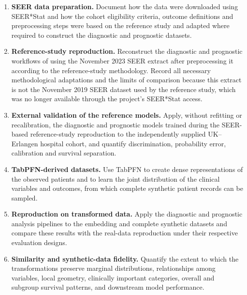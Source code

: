 \begin{enumerate}[label=\textbf{O\arabic*.},ref=O\arabic*]
\item \label{obj:data}\textbf{SEER data preparation.}
Document how the data were downloaded using SEER*Stat and how the cohort
eligibility criteria, outcome definitions and preprocessing steps were based on
the reference study and adapted where required to construct the diagnostic and
prognostic datasets.

\item \label{obj:reference}\textbf{Reference-study reproduction.}
Reconstruct the diagnostic and prognostic workflows of \citet{Li2023} using the
November 2023 SEER extract after preprocessing it according to the
reference-study methodology. Record all necessary methodological adaptations and
the limits of comparison because this extract is not the November 2019 SEER
dataset used by the reference study, which was no longer available through the
project's SEER*Stat access.

\item \label{obj:external}\textbf{External validation of the reference models.}
Apply, without refitting or recalibration, the diagnostic and prognostic models
trained during the SEER-based reference-study reproduction to the independently
supplied UK--Erlangen hospital cohort, and quantify discrimination, probability
error, calibration and survival separation.

\item \label{obj:transformations}\textbf{TabPFN-derived datasets.}
Use TabPFN to create dense representations of the observed patients and to learn
the joint distribution of the clinical variables and outcomes, from which
complete synthetic patient records can be sampled.

\item \label{obj:transformed-reproduction}\textbf{Reproduction on transformed data.}
Apply the diagnostic and prognostic analysis pipelines to the embedding and
complete synthetic datasets and compare these results with the real-data
reproduction under their respective evaluation designs.

\item \label{obj:similarity}\textbf{Similarity and synthetic-data fidelity.}
Quantify the extent to which the transformations preserve marginal
distributions, relationships among variables, local geometry, clinically
important categories, overall and subgroup survival patterns, and downstream
model performance.


\end{enumerate}
